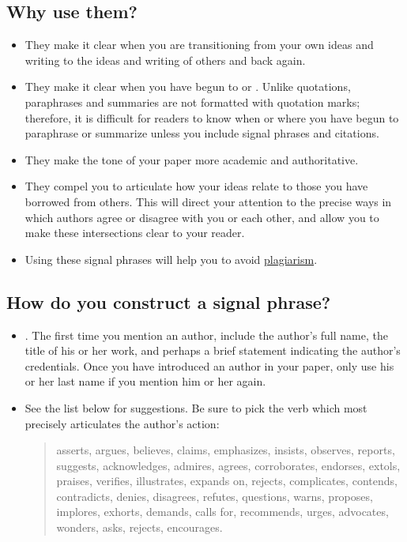 \subsection{Why use them?}
 \begin{itemize}

\item They make it clear when you are transitioning from your own ideas and
writing to the ideas and writing of others and back again.

\item They make it clear when you have begun to \hyperlink{paraphrase}{\color{Ahrenge}{paraphrase}} or \hyperlink{summary}{\color{Ahrenge}{summarize}}.
Unlike quotations, paraphrases and summaries are not formatted with quotation
marks; therefore, it is difficult for readers to know when or where you have
begun to paraphrase or summarize unless you include signal phrases and citations.

\item They make the tone of your paper more academic and authoritative.

\item They compel you to articulate how your ideas relate to those you
have borrowed from others. This will direct your attention to the precise
ways in which authors agree or disagree with you or each other, and allow
you to make these intersections clear to your reader.

\item Using these signal phrases will help you to avoid \hyperlink{plagiarism}{\color{Ahrenge}plagiarism}.
 \end{itemize}

\subsection{How do you construct a signal phrase?}

\begin{itemize}
\item {}. The first time you mention an author,
include the
author's full name, the title of his or her work, and perhaps a brief
statement indicating the
author's credentials. Once you have introduced an author in your paper,
only use his or
her last name if you mention him or her again.

\item {} See the list
below for suggestions. Be sure to pick the verb which most precisely
articulates the
author's action:

\begin{quote}
asserts, argues, believes, claims, emphasizes, insists, observes, reports,
suggests, acknowledges, admires, agrees, corroborates, endorses, extols,
praises, verifies, illustrates, expands on, rejects, complicates, contends, contradicts,
denies, disagrees, refutes, questions, warns, proposes, implores, exhorts, demands,
calls for, recommends, urges, advocates, wonders, asks, rejects, encourages.
\end{quote}

\end{itemize}

